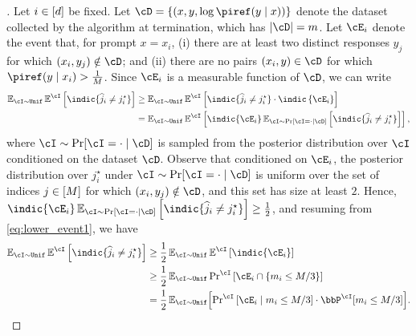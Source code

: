 \begin{proof}[]
    Let $i\in[d]$ be fixed. Let $\cD = \crl*{(x,y,\log\piref(y\mid{}x))}$ denote
  the dataset collected by the algorithm at termination, which has $\abs{\cD}=m$. Let $\cE_i$ denote the
  event that, for prompt $x = x_i$, (i) there are at least two
  distinct responses $y_j$ for which $(x_i,y_j) \notin \cD$; and (ii)
  there are no pairs $(x_i,y)\in\cD$ for which
  $\piref(y\mid{}x_i)>\frac{1}{M}$. Since $\cE_i$ is a measurable
  function of $\cD$, we can write
  \begin{align}
    \EnI\Enki\left[ \indic\{\wh{j}_i \ne j_i^\star\}\right]
    &\ge   \EnI\Enki\left[ \indic\{\wh{j}_i \ne j_i^\star\} \cdot \indic\left\{ \cE_i\right\}\right]\\
    &=   \EnI\Enki \left[\indic\{\cE_i\}\En_{\cI \sim \Pr[\cI=\cdot
      \mid \cD]}\left[ \indic\{\wh{j}_i \ne j^{\star}_i\}
      \right]\right],
      \label{eq:lower_event1}
  \end{align}
  where $\cI \sim \Pr[\cI=\cdot \mid \cD]$ is sampled from the
  posterior distribution over $\cI$ conditioned on the dataset
  $\cD$. Observe that conditioned on $\cE_i$, the posterior
  distribution over $j_i^{\star}$ under $\cI \sim \Pr[\cI=\cdot \mid
  \cD]$ is uniform over the set of indices $j\in[M]$ for which
  $(x_i, y_j)\notin\cD$, and this set has size at least $2$. Hence, $\indic\{\cE_i\}\En_{\cI \sim \Pr[\cI=\cdot
      \mid \cD]}\left[ \indic\{\wh{j}_i \ne
      j^{\star}_i\}\right]\geq\frac{1}{2}$, and
  resuming from \cref{eq:lower_event1}, we have
  \begin{align}
    \EnI\Enki\left[ \indic\{\wh{j}_i \ne j_i^\star\}\right] &\ge
                                                              \frac{1}{2}\EnI\Enki
                                                              \left[\indic\{\cE_i\}\right]
    \\
                                                            &\ge  \frac{1}{2}\EnI\Pnki \left[\cE_i \cap \crl{m_i \le M/3}\right] \\
                                                                                                                  &= \frac{1}{2} \EnI\brk*{\Pnki \left[\cE_i \mid m_i \le M/3\right]\cdot\bbP^{\cI}\brk*{m_i\leq{}M/3}}.
  \end{align}
    

\end{proof}
